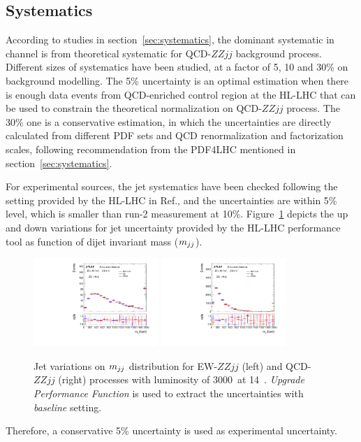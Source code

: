 \subsection{Systematics}

According to studies in section~\ref{sec:systematics}, the dominant systematic in \llll channel is from theoretical systematic for QCD-$ZZjj$ background process.
Different sizes of systematics have been studied, at a factor of 5, 10 and 30\% on background modelling.
The 5\% uncertainty is an optimal estimation when there is enough data events from QCD-enriched control region at the HL-LHC that can be used to constrain the theoretical normalization on QCD-$ZZjj$ process.
The 30\% one is a conservative estimation, in which the uncertainties are directly calculated from different PDF sets and QCD renormalization and factorization scales, following recommendation from the PDF4LHC mentioned in section~\ref{sec:systematics}.

For experimental sources, the jet systematics have been checked following the setting provided by the HL-LHC in Ref.\cite{ATL-PHYS-PUB-2016-026},
and the uncertainties are within 5\% level, which is smaller than run-2 measurement at 10\%.
Figure~\ref{fig:jet_uncer} depicts the up and down variations for jet uncertainty provided by the HL-LHC performance tool as function of dijet invariant mass ($m_{jj}$).
\begin{figure}
  \centering
  \includegraphics[width=0.42\textwidth]{figures/VBSZZ/hllhc/Uncer_baseline_TagJJM_ewk_linear.pdf}
  \includegraphics[width=0.42\textwidth]{figures/VBSZZ/hllhc/Uncer_baseline_TagJJM_qcd_linear.pdf}
  \caption{Jet variations on $m_{jj}$ distribution for EW-$ZZjj$ (left) and QCD-$ZZjj$ (right) processes
           with luminosity of 3000~\ifb at 14~\tev.
	   \textit{Upgrade Performance Function} is used to extract the uncertainties with \textit{baseline} setting.}
  \label{fig:jet_uncer}
\end{figure}
Therefore, a conservative 5\% uncertainty is used as experimental uncertainty.

